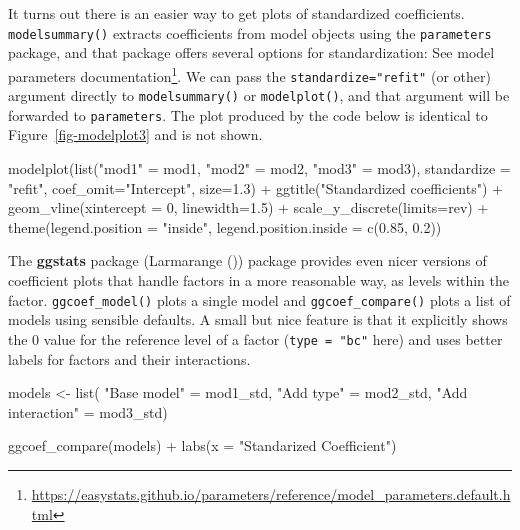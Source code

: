 \documentclass[
  letterpaper,
  10pt,
  krantz2]{krantz}
\makeatletter
\newenvironment{Shaded}{\begin{snugshade}}{\end{snugshade}}
\newcommand{\AttributeTok}[1]{\textcolor[rgb]{0.40,0.45,0.13}{#1}}
\newcommand{\DecValTok}[1]{\textcolor[rgb]{0.68,0.00,0.00}{#1}}
\newcommand{\FloatTok}[1]{\textcolor[rgb]{0.68,0.00,0.00}{#1}}
\newcommand{\FunctionTok}[1]{\textcolor[rgb]{0.28,0.35,0.67}{#1}}
\newcommand{\NormalTok}[1]{\textcolor[rgb]{0.00,0.23,0.31}{#1}}
\newcommand{\OtherTok}[1]{\textcolor[rgb]{0.00,0.23,0.31}{#1}}
\newcommand{\SpecialCharTok}[1]{\textcolor[rgb]{0.37,0.37,0.37}{#1}}
\newcommand{\StringTok}[1]{\textcolor[rgb]{0.13,0.47,0.30}{#1}}
\providecommand{\href}[2]{#2\footnote{\url{#1}}}
\newenvironment{kframe}{%
  \medskip{}
  \setlength{\fboxsep}{.8em}
  \def\at@end@of@kframe{}%
  \ifinner\ifhmode%
  \def\at@end@of@kframe{\end{minipage}}%
  \begin{minipage}{\columnwidth}%
  \fi\fi%
  \def\FrameCommand##1{\hskip\@totalleftmargin \hskip-\fboxsep
  \colorbox{shadecolor}{##1}\hskip-\fboxsep
      \hskip-\linewidth \hskip-\@totalleftmargin \hskip\columnwidth}%
  \MakeFramed {\advance\hsize-\width
    \@totalleftmargin\z@ \linewidth\hsize
    \@setminipage}}%
{\par\unskip\endMakeFramed%
  \at@end@of@kframe}
\renewenvironment{Shaded}{\begin{kframe}}{\end{kframe}}
\makeatother
\begin{document}
It turns out there is an easier way to get plots of standardized
coefficients. \texttt{modelsummary()} extracts coefficients from model
objects using the \texttt{parameters} package, and that package offers
several options for standardization: See
\href{https://easystats.github.io/parameters/reference/model_parameters.default.html}{model
parameters documentation}. We can pass the \texttt{standardize="refit"}
(or other) argument directly to \texttt{modelsummary()} or
\texttt{modelplot()}, and that argument will be forwarded to
\texttt{parameters}. The plot produced by the code below is identical to
Figure~\ref{fig-modelplot3} and is not shown.

\begin{Shaded}
\begin{Highlighting}[]
\FunctionTok{modelplot}\NormalTok{(}\FunctionTok{list}\NormalTok{(}\StringTok{"mod1"} \OtherTok{=}\NormalTok{ mod1, }\StringTok{"mod2"} \OtherTok{=}\NormalTok{ mod2, }\StringTok{"mod3"} \OtherTok{=}\NormalTok{ mod3),}
          \AttributeTok{standardize =} \StringTok{"refit"}\NormalTok{,}
          \AttributeTok{coef\_omit=}\StringTok{"Intercept"}\NormalTok{, }\AttributeTok{size=}\FloatTok{1.3}\NormalTok{) }\SpecialCharTok{+}
  \FunctionTok{ggtitle}\NormalTok{(}\StringTok{"Standardized coefficients"}\NormalTok{) }\SpecialCharTok{+}
  \FunctionTok{geom\_vline}\NormalTok{(}\AttributeTok{xintercept =} \DecValTok{0}\NormalTok{, }\AttributeTok{linewidth=}\FloatTok{1.5}\NormalTok{) }\SpecialCharTok{+}
  \FunctionTok{scale\_y\_discrete}\NormalTok{(}\AttributeTok{limits=}\NormalTok{rev) }\SpecialCharTok{+}
  \FunctionTok{theme}\NormalTok{(}\AttributeTok{legend.position =} \StringTok{"inside"}\NormalTok{,}
        \AttributeTok{legend.position.inside =} \FunctionTok{c}\NormalTok{(}\FloatTok{0.85}\NormalTok{, }\FloatTok{0.2}\NormalTok{))}
\end{Highlighting}
\end{Shaded}

The \textbf{ggstats} package (Larmarange
()) package provides even nicer versions
of coefficient plots that handle factors in a more reasonable way, as
levels within the factor. \texttt{ggcoef\_model()} plots a single model
and \texttt{ggcoef\_compare()} plots a list of models using sensible
defaults. A small but nice feature is that it explicitly shows the 0
value for the reference level of a factor (\texttt{type\ =\ "bc"} here)
and uses better labels for factors and their interactions.

\begin{Shaded}
\begin{Highlighting}[]
\NormalTok{models }\OtherTok{\textless{}{-}} \FunctionTok{list}\NormalTok{(}
  \StringTok{"Base model"}      \OtherTok{=}\NormalTok{ mod1\_std,}
  \StringTok{"Add type"}        \OtherTok{=}\NormalTok{ mod2\_std,}
  \StringTok{"Add interaction"} \OtherTok{=}\NormalTok{ mod3\_std)}

\FunctionTok{ggcoef\_compare}\NormalTok{(models) }\SpecialCharTok{+}
  \FunctionTok{labs}\NormalTok{(}\AttributeTok{x =} \StringTok{"Standarized Coefficient"}\NormalTok{)}
\end{Highlighting}
\end{Shaded}
\end{document}
